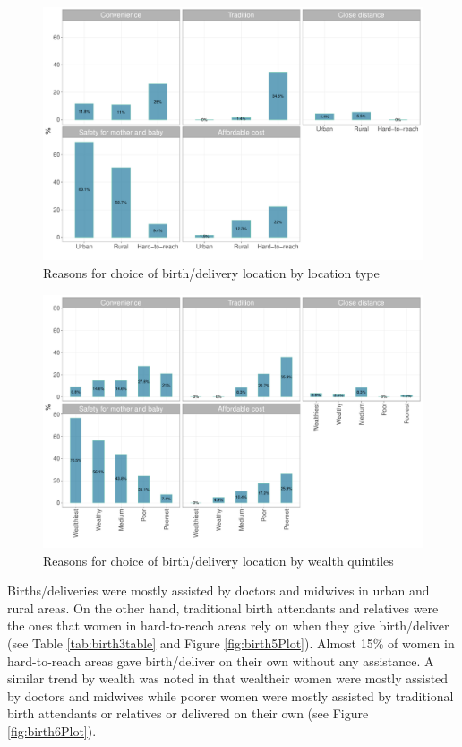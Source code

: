 \documentclass[12pt,a4paper]{article}
\begin{document}
\begin{figure}[H]

{\centering \includegraphics{kayahReport_files/figure-latex/birth3Plot-1} 

}

\caption{Reasons for choice of birth/delivery location by location type}\label{fig:birth3Plot}
\end{figure}

\begin{figure}[H]

{\centering \includegraphics{kayahReport_files/figure-latex/birth4Plot-1} 

}

\caption{Reasons for choice of birth/delivery location by wealth quintiles}\label{fig:birth4Plot}
\end{figure}

Births/deliveries were mostly assisted by doctors and midwives in urban and rural areas. On the other hand, traditional birth attendants and relatives were the ones that women in hard-to-reach areas rely on when they give birth/deliver (see Table \ref{tab:birth3table} and Figure \ref{fig:birth5Plot}). Almost 15\% of women in hard-to-reach areas gave birth/deliver on their own without any assistance. A similar trend by wealth was noted in that wealtheir women were mostly assisted by doctors and midwives while poorer women were mostly assisted by traditional birth attendants or relatives or delivered on their own (see Figure \ref{fig:birth6Plot}).
\end{document}
